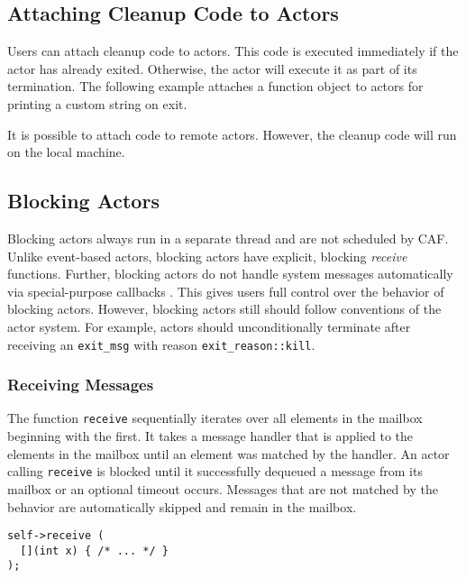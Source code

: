 
\subsection{Attaching Cleanup Code to Actors}
\label{attach}

Users can attach cleanup code to actors. This code is executed immediately if
the actor has already exited. Otherwise, the actor will execute it as part of
its termination. The following example attaches a function object to actors for
printing a custom string on exit.


It is possible to attach code to remote actors. However, the cleanup code will
run on the local machine.

\subsection{Blocking Actors}
\label{blocking-actor}

Blocking actors always run in a separate thread and are not scheduled by CAF.
Unlike event-based actors, blocking actors have explicit, blocking
\emph{receive} functions. Further, blocking actors do not handle system
messages automatically via special-purpose callbacks .
This gives users full control over the behavior of blocking actors. However,
blocking actors still should follow conventions of the actor system. For
example, actors should unconditionally terminate after receiving an
\lstinline^exit_msg^ with reason \lstinline^exit_reason::kill^.

\subsubsection{Receiving Messages}

The function \lstinline^receive^ sequentially iterates over all elements in the
mailbox beginning with the first. It takes a message handler that is applied to
the elements in the mailbox until an element was matched by the handler. An
actor calling \lstinline^receive^ is blocked until it successfully dequeued a
message from its mailbox or an optional timeout occurs. Messages that are not
matched by the behavior are automatically skipped and remain in the mailbox.

\begin{lstlisting}
self->receive (
  [](int x) { /* ... */ }
);
\end{lstlisting}

